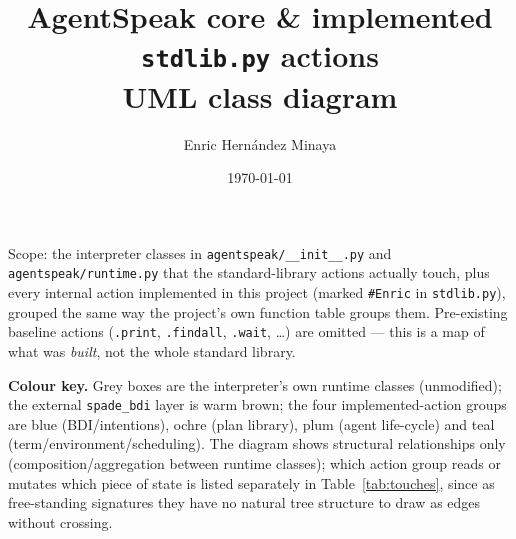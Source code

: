 \documentclass[11pt,a4paper]{article}
\title{AgentSpeak core \& implemented \texttt{stdlib.py} actions\\[2pt]
\large UML class diagram}
\author{Enric Hern\'andez Minaya}
\date{\today}
\newcommand{\ia}[1]{\texttt{#1}}
\begin{document}
\maketitle

\noindent Scope: the interpreter classes in \texttt{agentspeak/\_\_init\_\_.py}
and \texttt{agentspeak/runtime.py} that the standard-library actions actually
touch, plus every internal action implemented in this project (marked
\texttt{\#Enric} in \texttt{stdlib.py}), grouped the same way the project's
own function table groups them. Pre-existing baseline actions (\ia{.print},
\ia{.findall}, \ia{.wait}, \ldots{}) are omitted --- this is a map of what was
\emph{built}, not the whole standard library.

\bigskip
\noindent\textbf{Colour key.} Grey boxes are the interpreter's own runtime
classes (unmodified); the external \texttt{spade\_bdi} layer is warm brown;
the four implemented-action groups are blue (BDI/intentions), ochre (plan
library), plum (agent life-cycle) and teal (term/environment/scheduling). The
diagram shows structural relationships only (composition/aggregation between
runtime classes); which action group reads or mutates which piece of state is
listed separately in Table~\ref{tab:touches}, since as free-standing
signatures they have no natural tree structure to draw as edges without
crossing.
\end{document}
